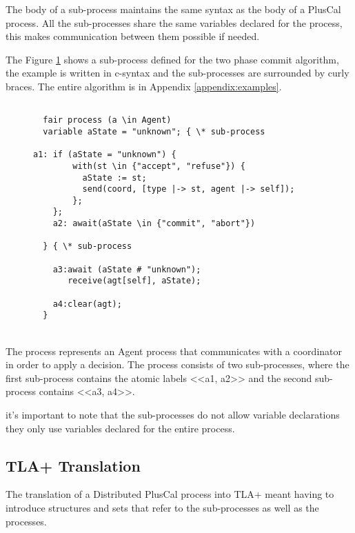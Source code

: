 \documentclass{thesul}
\begin{document}
The body of a sub-process maintains the same syntax as the body of a PlusCal process. All the sub-processes share the same variables declared for the process, this makes communication between them possible if needed.

The Figure \ref{2pcSub} shows a sub-process defined for the two phase commit algorithm, the example is written in c-syntax and the sub-processes are surrounded by curly braces.
The entire algorithm is in Appendix \ref{appendix:examples}.

\FloatBarrier
\begin{figure}[!h]
\label{2pcSub}
\begin{lstlisting}[caption = Distributed PlusCal Sub-Processes, frame = tlrb, firstnumber = 1]
   
  fair process (a \in Agent)
  variable aState = "unknown"; { \* sub-process

a1: if (aState = "unknown") {
        with(st \in {"accept", "refuse"}) {
          aState := st;
          send(coord, [type |-> st, agent |-> self]);
        };
    };
    a2: await(aState \in {"commit", "abort"})
    
  } { \* sub-process
    
    a3:await (aState # "unknown");
       receive(agt[self], aState); 
       
    a4:clear(agt);
  }

\end{lstlisting}
\end{figure}
\FloatBarrier

\hfill\\

The process represents an Agent process that communicates with a coordinator in order to apply a decision. The process consists of two sub-processes, where the first sub-process contains the atomic labels <<a1, a2>> and the second sub-process contains <<a3, a4>>.

it's important to note that the sub-processes do not allow variable declarations they only use variables declared for the entire process.

\subsection{TLA+ Translation}

The translation of a Distributed PlusCal process into TLA+ meant having to introduce structures and sets that refer to the sub-processes as well as the processes.
\end{document}
